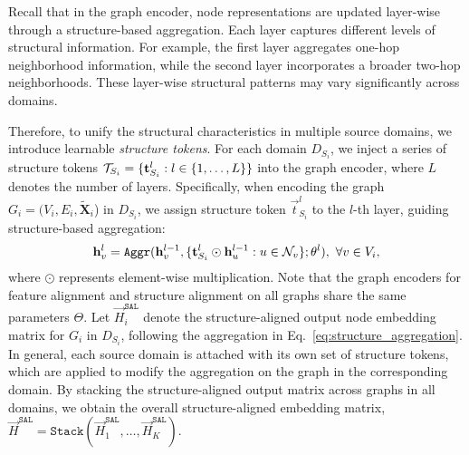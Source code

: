 Recall that in the graph encoder, node representations are updated layer-wise through a structure-based aggregation. Each layer captures different levels of structural information. For example, the first layer aggregates one-hop neighborhood information, while the second layer incorporates a broader two-hop neighborhoods. These layer-wise structural patterns may vary significantly across domains. 

Therefore, to unify the structural characteristics in multiple source domains, we introduce learnable \emph{structure tokens}. For each domain $D_{S_i}$, we inject a series of structure tokens $\bT_{S_i}=\{\Vec{t}^l_{S_i}:  l\in \{1,\ldots,L\}\}$ into the graph encoder, where $L$ denotes the number of layers. Specifically, when encoding the graph $G_i=(V_i,E_i,\tilde{\mathbf{X}}_i$) in $D_{S_i}$, we assign structure token $\Vec{t}^l_{S_i}$ to the $l$-th layer, guiding structure-based aggregation:
\begin{align}\label{eq:structure_aggregation}
    \vec{h}^l_{v} = \mathtt{Aggr}(\vec{h}^{l-1}_{v}, \{\Vec{t}^l_{S_i} \odot \vec{h}^{l-1}_{u} : u\in\bN_v\}; \theta^l),~\forall v\in V_i,
\end{align}
where $\odot$ represents element-wise multiplication. Note that the graph encoders for feature alignment and structure alignment on all graphs share the same parameters $\Theta$.
Let $\vec{H}^{\mathtt{SAL}}_{i}$ denote the structure-aligned output node embedding matrix for $G_i$ in $D_{S_i}$, following the aggregation in Eq.~\eqref{eq:structure_aggregation}.
In general, each source domain is attached with its own set of structure tokens,
which are applied to modify the aggregation on the graph in the corresponding domain. By stacking the structure-aligned output matrix across graphs in all domains, we obtain the overall structure-aligned embedding matrix,  
$\Vec{H}^\mathtt{SAL}= \mathtt{Stack}(\vec{H}^{\mathtt{SAL}}_{1},\ldots,\vec{H}^{\mathtt{SAL}}_{K})$.

